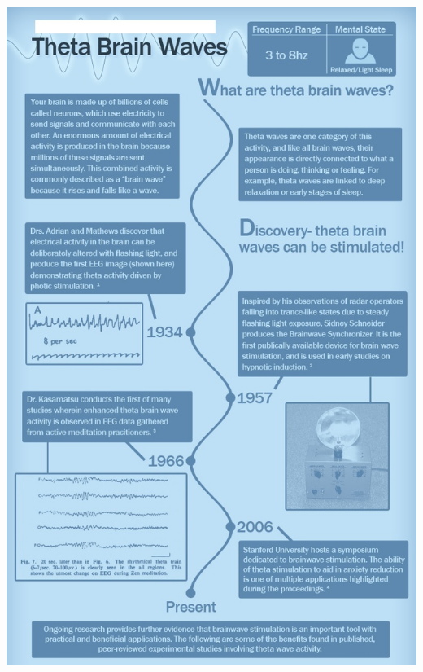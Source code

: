 \documentclass[10pt]{article}
\begin{document}
\begin{center}
	\graphicspath{ {images/} }
	\includegraphics[width=16cm, height=23cm]{Theta_waves}
\end{center}
\end{document}
